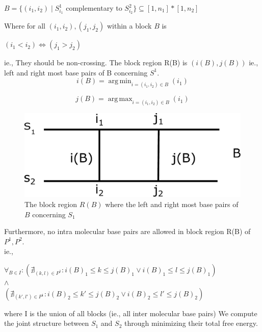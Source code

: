 \documentclass[twoside,a4paper]{report}
\DeclareMathOperator*{\argmin}{arg\,min}
\DeclareMathOperator*{\argmax}{arg\,max}
\numberwithin{equation}{section}
\begin{document}
 	\begin{center}
 	 $B = \{ (i_1 , i_2)  \mid  S^1_{i_1}$ complementary to $ S^2_{i_2} \} \subseteq [ 1, n_1] * [1 , n_2] $
 	\end{center}
 	
 	Where for all $(i_1 ,i_2) ,(j_1, j_2) $ within a block $B$ is 
 	
 	\begin{center}
 		$(i_1 < i_2) \iff  (j_1 > j_2)$
 	\end{center}
 	
 	ie., They should be non-crossing.  The block region R(B) is $(i(B) , j(B))$ ie., left and right most base pairs of B concerning $S^1$.\\
 	
 	\begin{equation*}
 		i(B) = \argmin_{i = (i_1, i_2 ) \in B } (i_1)
 	\end{equation*}
 
 	\begin{equation*}
 			j(B) = \argmax_{i = (i_1, i_2 ) \in B} (i_1)
 	\end{equation*}
 	
 	\begin{figure}[tb]
 		\includegraphics[width=0.6\linewidth]{block.pdf}
 		\centering
 		\caption{The block region $R(B)$ where the left and right most base pairs of $B$ concerning $S_1$}
 		\label{fig:block}
 	\end{figure}
 
 	 Furthermore, no intra molecular base pairs are allowed in block region R(B) of $P^1 , P^2$.\\
 	 ie.,
 	\begin{center}
 		 $\forall_{B\in I } : \left(\nexists_{(k,l) \in P^1} : i(B)_1 \le k \le j(B)_1  \vee   i(B)_1 \le l \le j(B)_1 \right) $ \\$\wedge $\\ 	$\left(\nexists_{(k',l') \in P^1} : i(B)_2 \le k' \le j(B)_2  \vee  i(B)_2 \le l' \le j(B)_2\right) $
 	\end{center}
 	
 	where I is the union of all blocks (ie., all inter molecular base pairs)
 	We compute the joint structure between $S_1$ and $S_2$ through minimizing their total free energy. 
	
\end{document}
